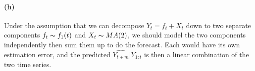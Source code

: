 \documentclass[11pt, letterpaper]{article}
\begin{document}
\paragraph{(h)}
Under the assumption that we can decompose $Y_t = f_t + X_t$ down to two separate components $f_t \thicksim f_1(t)$ and $X_t \thicksim MA(2)$, we should model the two components independently then sum them up to do the forecast. Each would have its own estimation error, and the predicted $\hat{Y_{t+m}}|Y_{1:t}$ is then a linear combination of the two time series.
\end{document}
